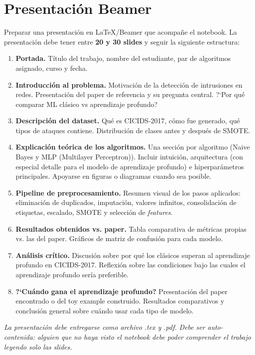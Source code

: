\documentclass[11pt,a4paper]{article}
\begin{document}
\section{Presentaci\'on Beamer}
Preparar una presentaci\'on en LaTeX/Beamer que acompa\~ne el notebook. La presentaci\'on debe tener entre \textbf{20 y 30 slides} y seguir la siguiente estructura:
\begin{enumerate}[leftmargin=2em,itemsep=3pt]
    \item \textbf{Portada.} T\'itulo del trabajo, nombre del estudiante, par de algoritmos asignado, curso y fecha.
    \item \textbf{Introducci\'on al problema.} Motivaci\'on de la detecci\'on de intrusiones en redes. Presentaci\'on del paper de referencia y su pregunta central. ?`Por qu\'e comparar ML cl\'asico vs aprendizaje profundo?
    \item \textbf{Descripci\'on del dataset.} Qu\'e es CICIDS-2017, c\'omo fue generado, qu\'e tipos de ataques contiene. Distribuci\'on de clases antes y despu\'es de SMOTE.
    \item \textbf{Explicaci\'on te\'orica de los algoritmos.} Una secci\'on por algoritmo (Naive Bayes y MLP (Multilayer Perceptron)). Incluir intuici\'on, arquitectura (con especial detalle para el modelo de aprendizaje profundo) e hiperpar\'ametros principales. Apoyarse en figuras o diagramas cuando sea posible.
    \item \textbf{Pipeline de preprocesamiento.} Resumen visual de los pasos aplicados: eliminaci\'on de duplicados, imputaci\'on, valores infinitos, consolidaci\'on de etiquetas, escalado, SMOTE y selecci\'on de \textit{features}.
    \item \textbf{Resultados obtenidos vs. paper.} Tabla comparativa de m\'etricas propias vs. las del paper. Gr\'aficos de matriz de confusi\'on para cada modelo.
    \item \textbf{An\'alisis cr\'itico.} Discusi\'on sobre por qu\'e los cl\'asicos superan al aprendizaje profundo en CICIDS-2017. Reflexi\'on sobre las condiciones bajo las cuales el aprendizaje profundo ser\'ia preferible.
    \item \textbf{?`Cu\'ando gana el aprendizaje profundo?} Presentaci\'on del paper encontrado o del toy example construido. Resultados comparativos y conclusi\'on general sobre cu\'ando usar cada tipo de modelo.
\end{enumerate}
\textit{La presentaci\'on debe entregarse como archivo .tex y .pdf. Debe ser auto-contenida: alguien que no haya visto el notebook debe poder comprender el trabajo leyendo solo las slides.}
\end{document}
